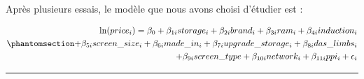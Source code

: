 \documentclass[
  12pt,
]{report}
\begin{document}
Après plusieurs essais, le modèle que nous avons choisi d'étudier est :

\begin{equation}\phantomsection\label{eq-log-hedonic}{
\begin{split}
\ln(price_i) = \beta_0 + \beta_{1i} storage_i + \beta_{2i}brand_i + \beta_{3i}ram_i + \beta_{4i}induction_i \\
+ \beta_{5i}screen\_size_i + \beta_{6i}made\_in_i + \beta_{7i}upgrade\_storage_i + \beta_{8i}das\_limbs_i  \\
+ \beta_{9i}screen\_type + \beta_{10i}network_i + \beta_{11i}ppi_i + \epsilon_i
\end{split}
}\end{equation}

\begin{center}\rule{0.5\linewidth}{0.5pt}\end{center}
\end{document}

